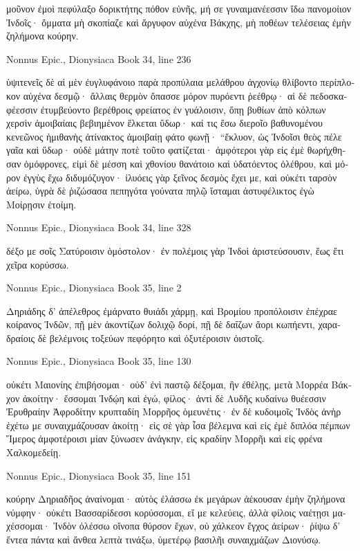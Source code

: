 \documentclass[12pt,letterpaper,twoside,final]{memoir}
\begin{document}
\begin{greek}
μοῦνον ἐμοὶ πεφύλαξο δορικτήτης πόθον εὐνῆς, 
μή σε γυναιμανέεσσιν ἴδω πανομοίιον Ἰνδοῖς· 
ὄμματα μὴ σκοπίαζε καὶ ἄργυφον αὐχένα Βάκχης, 
μὴ ποθέων τελέσειας ἐμὴν ζηλήμονα κούρην. 



Nonnus Epic., Dionysiaca 
Book 34, line 236

                                    ὑψιτενεῖς δὲ 
αἱ μὲν ἐυγλυφάνοιο παρὰ προπύλαια μελάθρου 
ἀγχονίῳ θλίβοντο περίπλοκον αὐχένα δεσμῷ· 
ἄλλαις θερμὸν ὄπασσε μόρον πυρόεντι ῥεέθρῳ· 
αἱ δὲ πεδοσκαφέεσσιν ἐτυμβεύοντο βερέθροις 
φρείατος ἐν γυάλοισιν, ὅπῃ βυθίων ἀπὸ κόλπων 
χερσὶν ἀμοιβαίαις βεβιημένον ἕλκεται ὕδωρ·   
καί τις ἔσω διεροῖο βαθυνομένου κενεῶνος 
ἡμιθανὴς ἀτίνακτος ἀμοιβαίῃ φάτο φωνῇ· 
 “ἔκλυον, ὡς Ἰνδοῖσι θεὸς πέλε γαῖα καὶ ὕδωρ· 
οὐδὲ μάτην ποτὲ τοῦτο φατίζεται· ἀμφότεροι γὰρ 
εἰς ἐμὲ θωρήχθησαν ὁμόφρονες, εἰμὶ δὲ μέσση 
καὶ χθονίου θανάτοιο καὶ ὑδατόεντος ὀλέθρου, 
καὶ μόρον ἐγγὺς ἔχω διδυμόζυγον· ἰλυόεις γὰρ 
ξεῖνος δεσμὸς ἔχει με, καὶ οὐκέτι ταρσὸν ἀείρω, 
ὑγρὰ δὲ ῥιζώσασα πεπηγότα γούνατα πηλῷ 
ἵσταμαι ἀστυφέλικτος ἐγὼ Μοίρῃσιν ἑτοίμη. 



Nonnus Epic., Dionysiaca 
Book 34, line 328

δέξο με σοῖς Σατύροισιν ὁμόστολον· ἐν πολέμοις γὰρ 
Ἰνδοὶ ἀριστεύσουσιν, ἕως ἔτι χεῖρα κορύσσω. 



Nonnus Epic., Dionysiaca 
Book 35, line 2

Δηριάδης δ' ἀπέλεθρος ἐμάρνατο θυιάδι χάρμῃ, 
καὶ Βρομίου προπόλοισιν ἐπέχραε κοίρανος Ἰνδῶν, 
πῇ μὲν ἀκοντίζων δολιχῷ δορί, πῇ δὲ δαΐζων 
ἄορι κωπήεντι, χαραδραίοις δὲ βελέμνοις 
τοξεύων πεφόρητο καὶ ὀξυτέροισιν ὀιστοῖς. 



Nonnus Epic., Dionysiaca 
Book 35, line 130

οὐκέτι Μαιονίης ἐπιβήσομαι· οὐδ' ἐνὶ παστῷ 
δέξομαι, ἢν ἐθέλῃς, μετὰ Μορρέα Βάκχον ἀκοίτην· 
ἔσσομαι Ἰνδῴη καὶ ἐγώ, φίλος· ἀντὶ δὲ Λυδῆς 
κυδαίνω θυέεσσιν Ἐρυθραίην Ἀφροδίτην 
κρυπταδίη Μορρῆος ὁμευνέτις· ἐν δὲ κυδοιμοῖς 
Ἰνδὸς ἀνὴρ ἐχέτω με συναιχμάζουσαν ἀκοίτῃ· 
εἰς σὲ γὰρ ἶσα βέλεμνα καὶ εἰς ἐμὲ διπλόα πέμπων 
Ἵμερος ἀμφοτέροισι μίαν ξύνωσεν ἀνάγκην, 
εἰς κραδίην Μορρῆι καὶ εἰς φρένα Χαλκομεδείῃ. 



Nonnus Epic., Dionysiaca 
Book 35, line 151

κούρην Δηριαδῆος ἀναίνομαι· αὐτὸς ἐλάσσω 
ἐκ μεγάρων ἀέκουσαν ἐμὴν ζηλήμονα νύμφην· 
οὐκέτι Βασσαρίδεσσι κορύσσομαι, εἴ με κελεύεις, 
ἀλλὰ φίλοις ναέτῃσι μαχέσσομαι· Ἰνδὸν ὀλέσσω   
οἴνοπα θύρσον ἔχων, οὐ χάλκεον ἔγχος ἀείρων· 
ῥίψω δ' ἔντεα πάντα καὶ ἄνθεα λεπτὰ τινάξω, 
ὑμετέρῳ βασιλῆι συναιχμάζων Διονύσῳ. 




\end{greek}
\end{document}
